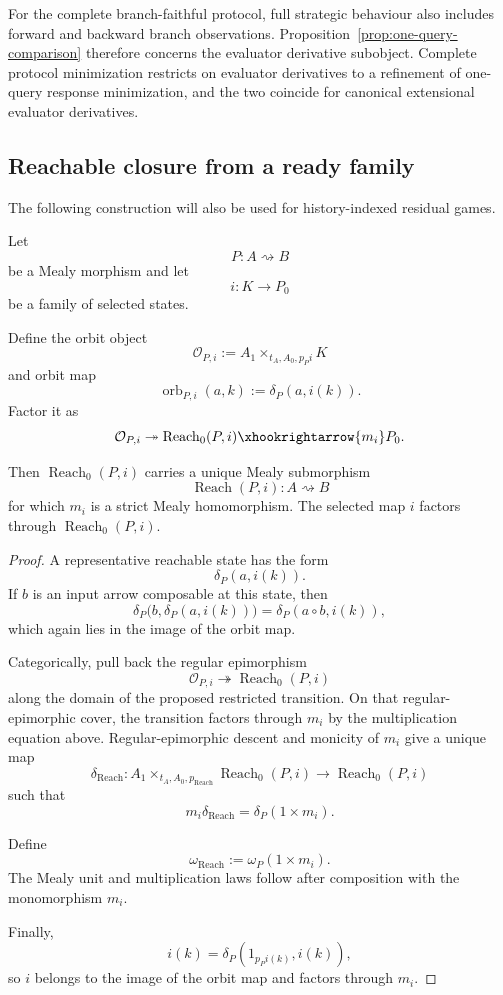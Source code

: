 For the complete branch-faithful protocol, full strategic behaviour also includes forward and
backward branch observations. Proposition~\ref{prop:one-query-comparison} therefore concerns the
evaluator derivative subobject. Complete protocol minimization restricts on evaluator derivatives to
a refinement of one-query response minimization, and the two coincide for canonical extensional
evaluator derivatives.

\subsection{Reachable closure from a ready family}

The following construction will also be used for history-indexed residual games.

\begin{lemma}
\label{lem:reachable-closure-selected-states}
Let
\[
  P:A\rightsquigarrow B
\]
be a Mealy morphism and let
\[
  i:K\to P_0
\]
be a family of selected states.

Define the orbit object
\[
  \mathcal O_{P,i}
  :=
  A_1\times_{t_A,A_0,p_Pi}K
\]
and orbit map
\[
  \operatorname{orb}_{P,i}(a,k)
  :=
  \delta_P(a,i(k)).
\]
Factor it as
\[
  \mathcal O_{P,i}
  \twoheadrightarrow
  \operatorname{Reach}_0(P,i)
  \xhookrightarrow{m_i}
  P_0.
\]

Then \(\operatorname{Reach}_0(P,i)\) carries a unique Mealy submorphism
\[
  \operatorname{Reach}(P,i):A\rightsquigarrow B
\]
for which \(m_i\) is a strict Mealy homomorphism. The selected map \(i\) factors through
\(\operatorname{Reach}_0(P,i)\).
\end{lemma}

\begin{proof}
A representative reachable state has the form
\[
  \delta_P(a,i(k)).
\]
If \(b\) is an input arrow composable at this state, then
\[
  \delta_P
  \bigl(
    b,\delta_P(a,i(k))
  \bigr)
  =
  \delta_P(a\circ b,i(k)),
\]
which again lies in the image of the orbit map.

Categorically, pull back the regular epimorphism
\[
  \mathcal O_{P,i}
  \twoheadrightarrow
  \operatorname{Reach}_0(P,i)
\]
along the domain of the proposed restricted transition. On that regular-epimorphic cover, the
transition factors through \(m_i\) by the multiplication equation above. Regular-epimorphic descent
and monicity of \(m_i\) give a unique map
\[
  \delta_{\operatorname{Reach}}:
  A_1\times_{t_A,A_0,p_{\operatorname{Reach}}}
  \operatorname{Reach}_0(P,i)
  \to
  \operatorname{Reach}_0(P,i)
\]
such that
\[
  m_i\delta_{\operatorname{Reach}}
  =
  \delta_P(1\times m_i).
\]

Define
\[
  \omega_{\operatorname{Reach}}
  :=
  \omega_P(1\times m_i).
\]
The Mealy unit and multiplication laws follow after composition with the monomorphism \(m_i\).

Finally,
\[
  i(k)
  =
  \delta_P(1_{p_Pi(k)},i(k)),
\]
so \(i\) belongs to the image of the orbit map and factors through \(m_i\).
\end{proof}

